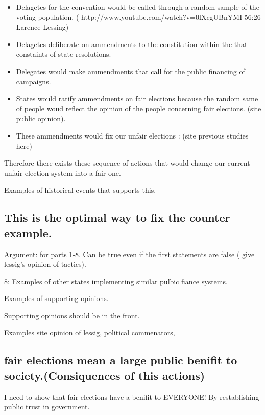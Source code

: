 \documentclass[11pt]{article} %
\begin{document}
\begin{enumerate}
\begin{itemize}
\item    Delagetes for the convention would be called through a random sample of the voting population. ( http://www.youtube.com/watch?v=0lXcgUBnYMI  56:26   Larence Lessing)

\item  Delagetes deliberate on ammendments to the constitution within the that constaints of state resolutions.  

\item Delegates would make ammendments that call for the public financing of campaigns.

\item  States would ratify ammendments on fair elections because the random same of people woud reflect the opinion of the people concerning fair elections. (site public opinion).

\item  These ammendments would fix our unfair elections : (site previous studies here)

\end{itemize}
Therefore there exists these sequence of actions that would change our current unfair election system into a fair one. 

Examples of historical events that supports this. 



\subsection{This is the optimal way to fix the counter example.}

Argument: for parts 1-8.  Can be true even if the first statements are false ( give lessig's opinion of tactics). 

8:  Examples of other states implementing similar pulbic fiance systems. 

Examples of supporting opinions.

Supporting opinions should be in the front. 

Examples site opinion of lessig, political commenators, 

\subsection{fair elections mean a large public benifit to society.(Consiquences of this actions)}

I need to show that fair elections have a benifit to EVERYONE! By restablishing public trust in government. 



\end{enumerate}
\end{document}
